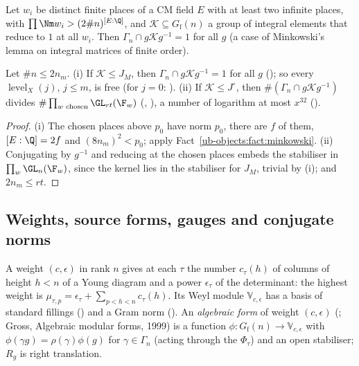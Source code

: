 \begin{fact}
\label{ub-objects:fact:minkowski}
Let $w_i$ be distinct finite places of a CM field $E$ with at least two infinite places, with
$\prod\Nm w_i>(2\#n)^{[E:\Q]}$, and
$\mathcal K\subseteq G_{\mathrm f}(n)$ a group of integral elements that reduce to $1$ at all $w_i$. Then
$\Gamma_n\cap g\mathcal Kg^{-1}=1$ for all $g$ (a case of Minkowski's lemma on integral matrices of finite
order).
\end{fact}

\begin{proposition}\label{ub-objects:prop:free}
Let $\#n\le2n_m$. (i) If $\mathcal K\le J_M$, then $\Gamma_n\cap g\mathcal Kg^{-1}=1$ for all $g$
(); so every $\operatorname{level}_X(j)$,
$j\le m$, is free (for $j=0$: ). (ii) If $\mathcal K\le J^\circ$,
then $\#(\Gamma_n\cap g\mathcal Kg^{-1})$ divides $\#\prod_{w\text{ chosen}}\GL_{rt}(\F_w)$
(, ), a number
of logarithm at most $x^{32}$ ().
\end{proposition}

\begin{proof}
(i) The chosen places above $p_0$ have norm $p_0$, there are $f$ of them, $[E:\Q]=2f$ and
$(8n_m)^2<p_0$; apply Fact~\ref{ub-objects:fact:minkowski}. (ii) Conjugating by $g^{-1}$ and
reducing at the chosen places embeds the stabiliser in $\prod_w\GL_n(\F_w)$, since the kernel lies in
the stabiliser for $J_M$, trivial by (i); and $2n_m\le rt$.
\end{proof}

\subsection{Weights, source forms, gauges and conjugate norms}\label{ub-objects:sec:source}

A weight $(c,\epsilon)$ in rank $n$ gives at each $\tau$ the number $c_\tau(h)$ of columns of height $h<n$
of a Young diagram and a power $\epsilon_\tau$ of the determinant: the highest weight is
$\mu_{\tau,p}=\epsilon_\tau+\sum_{p<h<n}c_\tau(h)$. Its Weyl module $\mathbb V_{c,\epsilon}$ has a basis of standard
fillings () and a Gram norm (). An \emph{algebraic form}
of weight $(c,\epsilon)$ (; Gross, Algebraic modular forms, 1999) is a function
$\phi\colon G_{\mathrm f}(n)\to \mathbb V_{c,\epsilon}$ with $\phi(\gamma g)=\rho(\gamma)\phi(g)$ for $\gamma\in\Gamma_n$
(acting through the $\Phi_\tau$) and an open stabiliser; $R_g$ is right translation.

